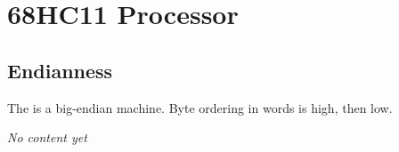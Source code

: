 \chapter{68HC11 Processor}
\label{processor:68HC11}

\section{Endianness}

The  is a big-endian machine. Byte ordering in words is high, then low.

\emph{No content yet}